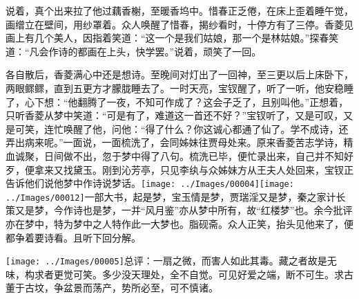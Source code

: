 说着，真个出来拉了他过藕香榭，至暖香坞中。惜春正乏倦，在床上歪着睡午觉，画缯立在壁间，用纱罩着。众人唤醒了惜春，揭纱看时，十停方有了三停。香菱见画上有几个美人，因指着笑道：``这一个是我们姑娘，那一个是林姑娘。''探春笑道：``凡会作诗的都画在上头，快学罢。''说着，顽笑了一回。

各自散后，香菱满心中还是想诗。至晚间对灯出了一回神，至三更以后上床卧下，两眼鳏鳏，直到五更方才朦胧睡去了。一时天亮，宝钗醒了，听了一听，他安稳睡了，心下想：``他翻腾了一夜，不知可作成了？这会子乏了，且别叫他。''正想着，只听香菱从梦中笑道：``可是有了，难道这一首还不好？''宝钗听了，又是可叹，又是可笑，连忙唤醒了他，问他：``得了什么？你这诚心都通了仙了。学不成诗，还弄出病来呢。''一面说，一面梳洗了，会同姊妹往贾母处来。原来香菱苦志学诗，精血诚聚，日间做不出，忽于梦中得了八句。梳洗已毕，便忙录出来，自己并不知好歹，便拿来又找黛玉。刚到沁芳亭，只见李纨与众姊妹方从王夫人处回来，宝钗正告诉他们说他梦中作诗说梦话。{\texttt{[image: ../Images/00004]}\texttt{[image: ../Images/00012]}\footnotesize \kaishu 一部大书，起是梦，宝玉情是梦，贾瑞淫又是梦，秦之家计长策又是梦，今作诗也是梦，一并``风月鉴''亦从梦中所有，故``红楼梦''也。余今批评亦在梦中，特为梦中之人特作此一大梦也。脂砚斋。}众人正笑，抬头见他来了，便都争着要诗看。且听下回分解。

{\texttt{[image: ../Images/00005]}总评：一扇之微，而害人如此其毒。藏之者故是无味，构求者更觉可笑。多少没天理处，全不自觉。可见好爱之端，断不可生。求古董于古坟，争盆景而荡产，势所必至，可不慎诸。}
